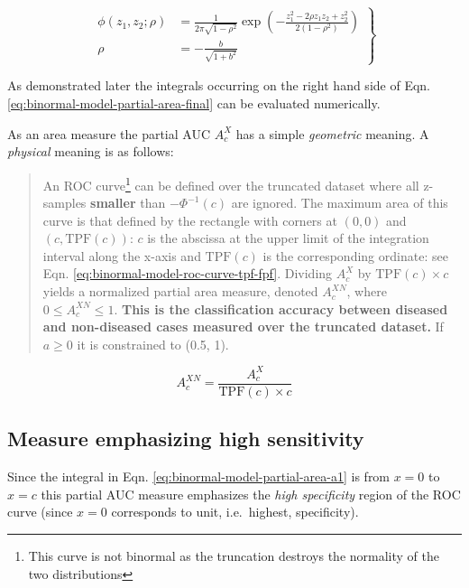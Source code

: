 \documentclass[
]{book}
\begin{document}
\begin{equation}
\left. 
\begin{aligned}
\phi\left (z_1,z_2;\rho \right ) &= \frac{1}{2 \pi \sqrt{1-\rho^2}} \exp\left ( -\frac{z_1^2 -2\rho z_1 z_2 +z_2^2}{2\left ( 1-\rho^2 \right )} \right ) \\
\rho &= - \frac{b}{\sqrt{1+b^2}}
\end{aligned}
\right \}
\label{eq:binormal-model-bivariate-density}
\end{equation}

As demonstrated later the integrals occurring on the right hand side of Eqn. \eqref{eq:binormal-model-partial-area-final} can be evaluated numerically.

As an area measure the partial AUC \(A_c^{X}\) has a simple \emph{geometric} meaning. A \emph{physical} meaning is as follows:

\begin{quote}
An ROC curve\footnote{This curve is not binormal as the truncation destroys the normality of the two distributions} can be defined over the truncated dataset where all z-samples \textbf{smaller} than \(-\Phi^{-1}(c)\) are ignored. The maximum area of this curve is that defined by the rectangle with corners at \((0,0)\) and \((c,\text{TPF}\left ( c \right ))\): \(c\) is the abscissa at the upper limit of the integration interval along the x-axis and \(\text{TPF}\left ( c \right )\) is the corresponding ordinate: see Eqn. \eqref{eq:binormal-model-roc-curve-tpf-fpf}. Dividing \(A_c^{X}\) by \(\text{TPF}\left ( c \right ) \times c\) yields a normalized partial area measure, denoted \(A_c^{XN}\), where \(0 \le A_c^{XN} \le 1\). \textbf{This is the classification accuracy between diseased and non-diseased cases measured over the truncated dataset.} If \(a \ge 0\) it is constrained to (0.5, 1).
\end{quote}

\begin{equation}
A_c^{XN} = \frac{A_c^{X}}{\text{TPF}\left ( c \right ) \times c}
\label{eq:binormal-model-normalized-partial-auc-specificity}
\end{equation}

\hypertarget{binormal-model-metz-partial-auc}{%
\subsection{Measure emphasizing high sensitivity}\label{binormal-model-metz-partial-auc}}

Since the integral in Eqn. \eqref{eq:binormal-model-partial-area-a1} is from \(x = 0\) to \(x = c\) this partial AUC measure emphasizes the \emph{high specificity} region of the ROC curve (since \(x = 0\) corresponds to unit, i.e.~highest, specificity).
\end{document}
